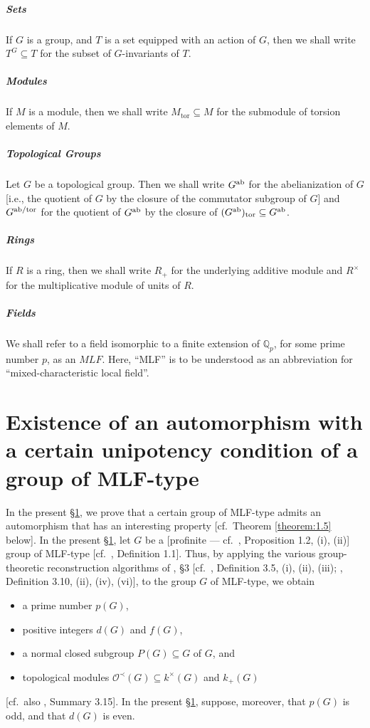 \documentclass[11pt,showkeys]{article}
\theoremstyle{theorem}
\theoremstyle{definition}
\def\Qp{{{\mathbb Q}_p}}
\def\CalO{{\mathcal O}}
\begin{document}
\subparagraph{Sets} If $G$ is a group, and $T$ is a set equipped with an action of $G$, then we shall write $T^G \subseteq T$ for the subset of $G$-invariants of $T$. 


\subparagraph{Modules} If $M$ is a module, then we shall write $M_{\mathrm{tor}} \subseteq M$ for the submodule of torsion elements of $M$. 

\subparagraph{Topological Groups} Let $G$ be a topological group. Then we shall write $G^{\rm ab}$ for
the abelianization of $G$ [i.e., the quotient of $G$ by the closure of the commutator subgroup
of $G$] and $G^{\rm ab/tor}$ for the quotient of $G^{\rm ab}$ by the closure of
$(G^{\rm ab})_{\rm tor} \subseteq G^{\rm ab}$. 

\subparagraph{Rings}
If $R$ is a ring, then we shall write $R_+$ for the underlying additive module and $R^\times$ for the multiplicative module of units of $R$.  

\subparagraph{Fields} We shall refer to a field isomorphic to a finite extension of $\Qp$, for some prime number $p$, as an $MLF$. Here, ``MLF'' is to be understood as an abbreviation for ``mixed-characteristic local field''. 

\section{Existence of an automorphism with a certain unipotency condition of a group of MLF-type}\label{section1}

In the present \S \ref{section1}, we prove that a certain group 
of MLF-type admits an automorphism that has an interesting property 
[cf.\ Theorem \ref{theorem:1.5} below]. 
In the present \S \ref{section1}, let $G$ be a [profinite --- cf.\ \cite{Hoshi4}, Proposition 1.2, (i), (ii)] group of MLF-type [cf.\ \cite{Hoshi4}, Definition 1.1]. Thus, by applying the various group-theoretic reconstruction algorithms of \cite{Hoshi1}, \S 3 [cf.\ \cite{Hoshi1}, Definition 3.5, (i), (ii), (iii); \cite{Hoshi1}, Definition 3.10, (ii), (iv), (vi)], to  the group $G$ of MLF-type, we obtain
\begin{itemize}
  \item a prime number $p(G)$,
  \item positive integers $d(G)$ and $f(G)$, 
  \item a normal closed subgroup $P(G) \subseteq G$ of $G$, and
  \item topological modules $\CalO^{\prec}(G) \subseteq k^{\times}(G)$ and $k_+(G)$ 
\end{itemize}
[cf.\ also \cite{Hoshi1}, Summary 3.15]. 
In the present \S \ref{section1}, suppose, moreover, that $p(G)$ is odd, and that $d(G)$ is even. 
\end{document}
